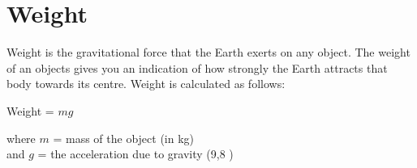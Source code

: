 \section{Weight}

Weight is the gravitational force that the Earth exerts on any object. The weight of an objects gives you an indication of how strongly the Earth attracts that body towards its centre. Weight is calculated as follows:
\begin{center}
Weight = $mg$
\end{center}

where $m$ = mass of the object (in kg)\\
and $g$ = the acceleration due to gravity (9,8 \mss)

